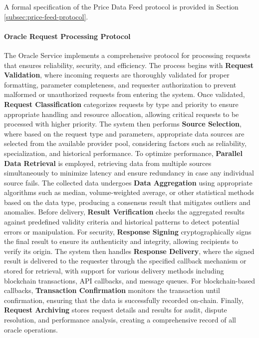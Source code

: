 \documentclass[12pt,a4paper]{article}
\begin{document}
A formal specification of the Price Data Feed protocol is provided in Section \ref{subsec:price-feed-protocol}.



\paragraph{Oracle Request Processing Protocol}
The Oracle Service implements a comprehensive protocol for processing requests that ensures reliability, security, and efficiency. The process begins with \textbf{Request Validation}, where incoming requests are thoroughly validated for proper formatting, parameter completeness, and requester authorization to prevent malformed or unauthorized requests from entering the system. Once validated, \textbf{Request Classification} categorizes requests by type and priority to ensure appropriate handling and resource allocation, allowing critical requests to be processed with higher priority. The system then performs \textbf{Source Selection}, where based on the request type and parameters, appropriate data sources are selected from the available provider pool, considering factors such as reliability, specialization, and historical performance. To optimize performance, \textbf{Parallel Data Retrieval} is employed, retrieving data from multiple sources simultaneously to minimize latency and ensure redundancy in case any individual source fails. The collected data undergoes \textbf{Data Aggregation} using appropriate algorithms such as median, volume-weighted average, or other statistical methods based on the data type, producing a consensus result that mitigates outliers and anomalies. Before delivery, \textbf{Result Verification} checks the aggregated results against predefined validity criteria and historical patterns to detect potential errors or manipulation. For security, \textbf{Response Signing} cryptographically signs the final result to ensure its authenticity and integrity, allowing recipients to verify its origin. The system then handles \textbf{Response Delivery}, where the signed result is delivered to the requester through the specified callback mechanism or stored for retrieval, with support for various delivery methods including blockchain transactions, API callbacks, and message queues. For blockchain-based callbacks, \textbf{Transaction Confirmation} monitors the transaction until confirmation, ensuring that the data is successfully recorded on-chain. Finally, \textbf{Request Archiving} stores request details and results for audit, dispute resolution, and performance analysis, creating a comprehensive record of all oracle operations.
\end{document}
